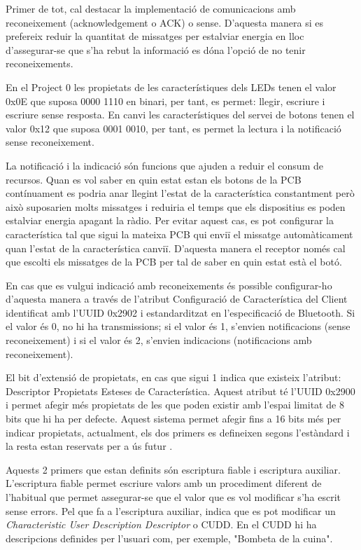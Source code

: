 Primer de tot, cal destacar la implementació de comunicacions amb reconeixement (acknowledgement o ACK) o sense. D'aquesta manera si es prefereix reduir la quantitat de missatges per estalviar energia en lloc d'assegurar-se que s'ha rebut la informació es dóna l'opció de no tenir reconeixements.

En el Project 0 les propietats de les característiques dels LEDs tenen el valor 0x0E que suposa  0000 1110 en binari, per tant, es permet: llegir, escriure i escriure sense resposta.
En canvi les característiques del servei de botons tenen el valor 0x12 que suposa 0001 0010, per tant, es permet la lectura i la notificació sense reconeixement.

La notificació i la indicació són funcions que ajuden a reduir el consum de recursos.
Quan es vol saber en quin estat estan els botons de la PCB contínuament es podria anar llegint l'estat de la característica constantment però això suposarien molts missatges i reduiria el temps que els dispositius es poden estalviar energia apagant la ràdio.
Per evitar aquest cas, es pot configurar la característica tal que sigui la mateixa PCB qui enviï el missatge automàticament quan l'estat de la característica canviï.
D'aquesta manera el receptor només cal que escolti els missatges de la PCB per tal de saber en quin estat està el botó.

En cas que es vulgui indicació amb reconeixements és possible configurar-ho d'aquesta manera a través de l'atribut Configuració de Característica del Client identificat amb l'UUID 0x2902 i estandarditzat en l'especificació de Bluetooth.
Si el valor és 0, no hi ha transmissions; si el valor és 1, s'envien notificacions (sense reconeixement) i si el valor és 2, s'envien indicacions (notificacions amb reconeixement). 

El bit d'extensió de propietats, en cas que sigui 1 indica que existeix l'atribut: Descriptor Propietats Esteses de Característica.
Aquest atribut té l'UUID 0x2900 i permet afegir més propietats de les que poden existir amb l'espai limitat de 8 bits que hi ha per defecte.
Aquest sistema permet afegir fins a 16 bits més per indicar propietats, actualment, els dos primers es defineixen segons l'estàndard i la resta estan reservats per a ús futur \cite{extended properties}.

Aquests 2 primers que estan definits són escriptura fiable i escriptura auxiliar.
L'escriptura fiable permet escriure valors amb un procediment diferent de l'habitual que permet assegurar-se que el valor que es vol modificar s'ha escrit sense errors.
Pel que fa a l'escriptura auxiliar, indica que es pot modificar un \textit{Characteristic User Description Descriptor} o CUDD.
En el CUDD hi ha descripcions definides per l'usuari com, per exemple, "Bombeta de la cuina".


